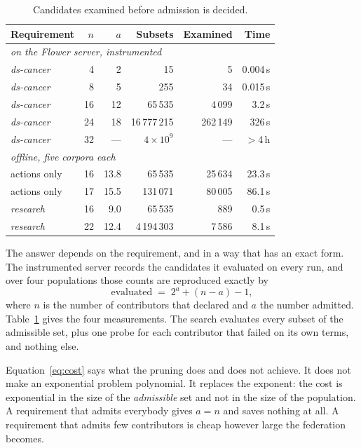\documentclass[10pt,conference]{IEEEtran}
\begin{document}
\begin{table}[t]
\caption{Candidates examined before admission is decided.}
\label{tab:pruning}
\centering
\begin{tabular}{lrrrrr}
\toprule
Requirement & $n$ & $a$ & Subsets & Examined & Time \\
\midrule
\multicolumn{6}{l}{\emph{on the Flower server, instrumented}} \\
\emph{ds-cancer} & 4 & 2 & 15 & 5 & 0.004\,s \\
\emph{ds-cancer} & 8 & 5 & 255 & 34 & 0.015\,s \\
\emph{ds-cancer} & 16 & 12 & 65\,535 & 4\,099 & 3.2\,s \\
\emph{ds-cancer} & 24 & 18 & 16\,777\,215 & 262\,149 & 326\,s \\
\emph{ds-cancer} & 32 & --- & $4{\times}10^{9}$ & --- & $>$4\,h \\
\midrule
\multicolumn{6}{l}{\emph{offline, five corpora each}} \\
actions only & 16 & 13.8 & 65\,535 & 25\,634 & 23.3\,s \\
actions only & 17 & 15.5 & 131\,071 & 80\,005 & 86.1\,s \\
\emph{research} & 16 & 9.0 & 65\,535 & 889 & 0.5\,s \\
\emph{research} & 22 & 12.4 & 4\,194\,303 & 7\,586 & 8.1\,s \\
\bottomrule
\end{tabular}
\end{table}

The answer depends on the requirement, and in a way that has an exact form. The
instrumented server records the candidates it evaluated on every run, and over
four populations those counts are reproduced exactly by
\begin{equation}
\label{eq:cost}
\textrm{evaluated} \;=\; 2^{a} + (n - a) - 1 ,
\end{equation}
where $n$ is the number of contributors that declared and $a$ the number
admitted. Table~\ref{tab:pruning} gives the four measurements. The search
evaluates every subset of the admissible set, plus one probe for each
contributor that failed on its own terms, and nothing else.

Equation~\ref{eq:cost} says what the pruning does and does not achieve. It does
not make an exponential problem polynomial. It replaces the exponent: the cost
is exponential in the size of the \emph{admissible} set and not in the size of
the population. A requirement that admits everybody gives $a = n$ and saves
nothing at all. A requirement that admits few contributors is cheap however
large the federation becomes.
\end{document}
